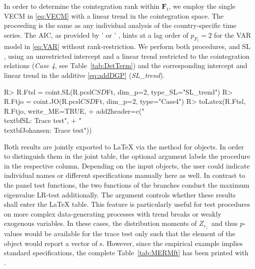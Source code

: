 In order to determine the cointegration rank within $ \boldsymbol{F}_{t} $, we employ the single VECM in \eqref{eq:VECM} with a linear trend in the cointegration space. The proceeding is the same as any individual analysis of the country-specific time series. The AIC, as provided by '  or ' , hints at a lag order of $ p_{F_t}=2 $ for the VAR model in \eqref{eq:VAR} without rank-restriction.
We perform both procedures, \citet{Johansen1996} and SL \citeyearpar{SaikkonenLutkepohl2000c}, using an unrestricted intercept and a linear trend restricted to the cointegration relations (\textit{Case 4}, see Table~\ref{tab:DetTerm}) and the corresponding intercept and linear trend in the additive \eqref{eq:addDGP} (\textit{SL\_trend}).
\begin{CodeChunk}
\begin{CodeInput}
R> R.Ftsl = coint.SL(R.pcsl$CSD$Ft, dim_p=2, type_SL="SL_trend")
R> R.Ftjo = coint.JO(R.pcsl$CSD$Ft, dim_p=2, type="Case4")
R> toLatex(R.Ftsl, R.Ftjo, write_ME=TRUE, 
+     add2header=c("\\textbf{SL:} Trace test", 
+                  "\\textbf{Johansen:} Trace test"))
\end{CodeInput}
\end{CodeChunk}
Both results are jointly exported to LaTeX via the  method for  objects. In order to distinguish them in the joint table, the optional argument  labels the procedure in the respective column. Depending on the input  objects, the user could indicate individual names or different specifications manually here as well. In contrast to the panel test functions, the two functions of the  branches conduct the maximum eigenvalue LR-test additionally. The argument  controls whether these results shall enter the LaTeX table. This feature is particularly useful for test procedures on more complex data-generating processes with trend breaks or weakly exogenous variables. In these cases, the distribution moments of $ Z_{r_\perp} $ and thus $p$-values would be available for the trace test only such that the element  of the  object would report a vector of s. However, since the empirical example implies standard specifications, the complete Table~\ref{tab:MERMft} has been printed with .
 
